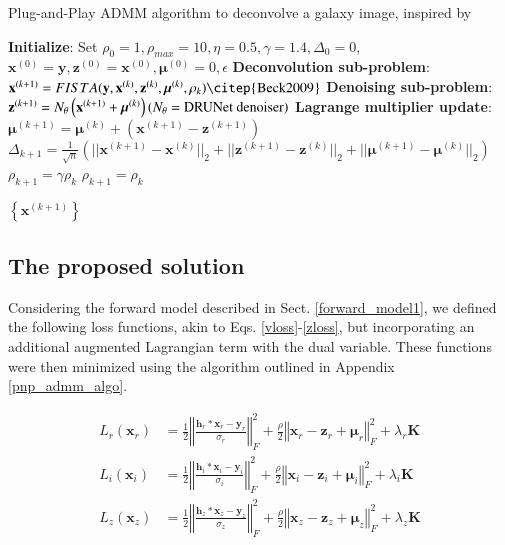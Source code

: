\documentclass[traditabstract]{aa}
\begin{document}
\begin{appendix}
\begin{algorithm*}
  \caption{Plug-and-Play ADMM algorithm to deconvolve a galaxy image, inspired by \cite{sureau2020}\label{Algo:ADMMPnP}}
  \begin{algorithmic}[1]
  \STATE \textbf{Initialize}: Set $\rho_0=1, \rho_{max}=10, \eta=0.5, \gamma=1.4, \Delta_0=0$, $\mathbf{x}^{(0)}=\mathbf{y}, \mathbf{z}^{(0)}=\mathbf{x}^{(0)}, \boldsymbol{\mu}^{(0)}=0, \epsilon$ 
  \STATE \textbf{Deconvolution sub-problem}: $\mathbf{x}^{(k+1)}=FISTA(\textbf{y},\mathbf{x}^{(k)},\mathbf{z}^{(k)},\boldsymbol{\mu}^{(k)},\rho_k) \hfill \text{\citep{Beck2009}}$   
  \STATE \textbf{Denoising sub-problem}: $\mathbf{z}^{(k+1)} = N_{\theta} \left(\mathbf{x}^{(k+1)}+\boldsymbol{\mu}^{(k)}\right) \hfill (N_{\theta} = \text{DRUNet denoiser})$ 
  \STATE \textbf{Lagrange multiplier update}: $\boldsymbol{\mu}^{(k+1)}=\boldsymbol{\mu}^{(k)}+\left(\mathbf{x}^{(k+1)}-\mathbf{z}^{(k+1)}\right)$
  \STATE $\Delta_{k+1}=\frac{1}{\sqrt{n}}\left(||\mathbf{x}^{(k+1)}-\mathbf{x}^{(k)}||_2+||\mathbf{z}^{(k+1)}-\mathbf{z}^{(k)}||_2+||\boldsymbol{\mu}^{(k+1)}-\boldsymbol{\mu}^{(k)}||_2\right)$
      \STATE  $\rho_{k+1}=\gamma\rho_k$
  \ELSE
      \STATE  $\rho_{k+1}=\rho_k$
  \ENDIF

\ENDFOR
\RETURN $\left\{\mathbf{x}^{(k+1)}\right\}$
  \end{algorithmic}
\end{algorithm*}

\subsection{The proposed solution}
\label{pnp_admm_sol}

Considering the forward model described in Sect. \ref{forward_model1}, we defined the following loss functions, akin to Eqs. \ref{vloss}-\ref{zloss}, but incorporating an additional augmented Lagrangian term with the dual variable. These functions were then minimized using the algorithm outlined in Appendix \ref{pnp_admm_algo}.

\begin{align} 
    L_r(\mathbf{x}_r) &= \frac{1}{2} \left\Vert \frac{\mathbf{h}_r \ast \mathbf{x}_r - \mathbf{y}_r}{\sigma_r} \right\Vert_F^2 + \frac{\rho}{2} \left\Vert \mathbf{x}_r - \mathbf{z}_r + \mathbf{\mu}_r \right\Vert_F^2 + \lambda_{r} \textbf{K} \label{vloss_pnp}\\[10pt]
    L_i(\mathbf{x}_i) &= \frac{1}{2} \left\Vert \frac{\mathbf{h}_i \ast \mathbf{x}_i - \mathbf{y}_i}{\sigma_i} \right\Vert_F^2 + \frac{\rho}{2} \left\Vert \mathbf{x}_i - \mathbf{z}_i + \mathbf{\mu}_i \right\Vert_F^2 + \lambda_{i} \textbf{K} \label{iloss_pnp}\\[10pt]
    L_z(\mathbf{x}_z) &= \frac{1}{2} \left\Vert \frac{\mathbf{h}_z \ast \mathbf{x}_z - \mathbf{y}_z}{\sigma_z} \right\Vert_F^2 + \frac{\rho}{2} \left\Vert \mathbf{x}_z - \mathbf{z}_z + \mathbf{\mu}_z \right\Vert_F^2 + \lambda_{z} \textbf{K} \label{zloss_pnp}
\end{align}


\end{appendix}
\end{document}
